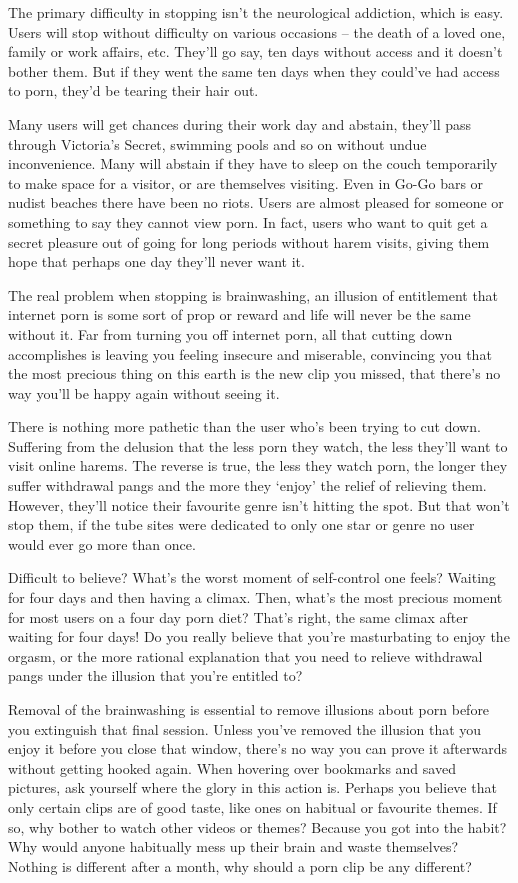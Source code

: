 \documentclass[
]{book}
\begin{document}
The primary difficulty in stopping isn't the neurological addiction, which is easy. Users will stop without difficulty on various occasions -- the death of a loved one, family or work affairs, etc. They'll go say, ten days without access and it doesn't bother them. But if they went the same ten days when they could've had access to porn, they'd be tearing their hair out.

Many users will get chances during their work day and abstain, they'll pass through Victoria's Secret, swimming pools and so on without undue inconvenience. Many will abstain if they have to sleep on the couch temporarily to make space for a visitor, or are themselves visiting. Even in Go-Go bars or nudist beaches there have been no riots. Users are almost pleased for someone or something to say they cannot view porn. In fact, users who want to quit get a secret pleasure out of going for long periods without harem visits, giving them hope that perhaps one day they'll never want it.

The real problem when stopping is brainwashing, an illusion of entitlement that internet porn is some sort of prop or reward and life will never be the same without it. Far from turning you off internet porn, all that cutting down accomplishes is leaving you feeling insecure and miserable, convincing you that the most precious thing on this earth is the new clip you missed, that there's no way you'll be happy again without seeing it.

There is nothing more pathetic than the user who's been trying to cut down. Suffering from the delusion that the less porn they watch, the less they'll want to visit online harems. The reverse is true, the less they watch porn, the longer they suffer withdrawal pangs and the more they `enjoy' the relief of relieving them. However, they'll notice their favourite genre isn't hitting the spot. But that won't stop them, if the tube sites were dedicated to only one star or genre no user would ever go more than once.

Difficult to believe? What's the worst moment of self-control one feels? Waiting for four days and then having a climax. Then, what's the most precious moment for most users on a four day porn diet? That's right, the same climax after waiting for four days! Do you really believe that you're masturbating to enjoy the orgasm, or the more rational explanation that you need to relieve withdrawal pangs under the illusion that you're entitled to?

Removal of the brainwashing is essential to remove illusions about porn before you extinguish that final session. Unless you've removed the illusion that you enjoy it before you close that window, there's no way you can prove it afterwards without getting hooked again. When hovering over bookmarks and saved pictures, ask yourself where the glory in this action is. Perhaps you believe that only certain clips are of good taste, like ones on habitual or favourite themes. If so, why bother to watch other videos or themes? Because you got into the habit? Why would anyone habitually mess up their brain and waste themselves? Nothing is different after a month, why should a porn clip be any different?
\end{document}
